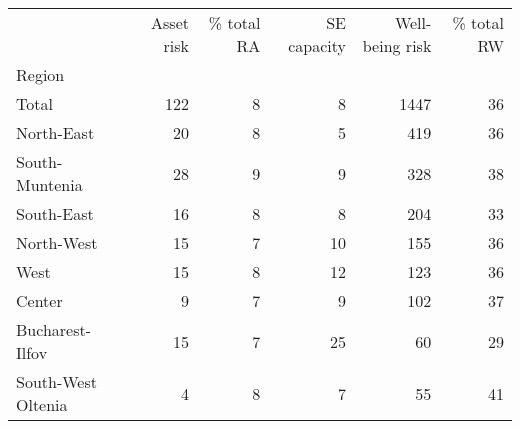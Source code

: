 \begin{tabular}{lrrrrr}
\toprule
{} &  Asset risk &  \% total RA &  SE capacity &  Well-being risk &  \% total RW \\
Region             &             &             &              &                  &             \\
\midrule
Total              &         122 &           8 &            8 &             1447 &          36 \\
North-East         &          20 &           8 &            5 &              419 &          36 \\
South-Muntenia     &          28 &           9 &            9 &              328 &          38 \\
South-East         &          16 &           8 &            8 &              204 &          33 \\
North-West         &          15 &           7 &           10 &              155 &          36 \\
West               &          15 &           8 &           12 &              123 &          36 \\
Center             &           9 &           7 &            9 &              102 &          37 \\
Bucharest-Ilfov    &          15 &           7 &           25 &               60 &          29 \\
South-West Oltenia &           4 &           8 &            7 &               55 &          41 \\
\bottomrule
\end{tabular}
